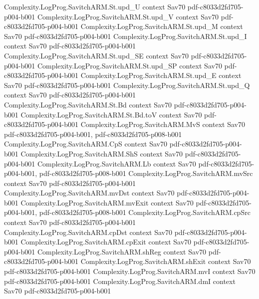 \begin{theorem}
\proofstep
  {Complexity.LogProg.SavitchARM.St.upd_U}
  {context}
  {Sav70}
  {pdf-c8033d2fd705-p004-b001}
\proofstep
  {Complexity.LogProg.SavitchARM.St.upd_V}
  {context}
  {Sav70}
  {pdf-c8033d2fd705-p004-b001}
\proofstep
  {Complexity.LogProg.SavitchARM.St.upd_M}
  {context}
  {Sav70}
  {pdf-c8033d2fd705-p004-b001}
\proofstep
  {Complexity.LogProg.SavitchARM.St.upd_I}
  {context}
  {Sav70}
  {pdf-c8033d2fd705-p004-b001}
\proofstep
  {Complexity.LogProg.SavitchARM.St.upd_SE}
  {context}
  {Sav70}
  {pdf-c8033d2fd705-p004-b001}
\proofstep
  {Complexity.LogProg.SavitchARM.St.upd_SP}
  {context}
  {Sav70}
  {pdf-c8033d2fd705-p004-b001}
\proofstep
  {Complexity.LogProg.SavitchARM.St.upd_E}
  {context}
  {Sav70}
  {pdf-c8033d2fd705-p004-b001}
\proofstep
  {Complexity.LogProg.SavitchARM.St.upd_Q}
  {context}
  {Sav70}
  {pdf-c8033d2fd705-p004-b001}
\proofstep
  {Complexity.LogProg.SavitchARM.St.Bd}
  {context}
  {Sav70}
  {pdf-c8033d2fd705-p004-b001}
\proofstep
  {Complexity.LogProg.SavitchARM.St.Bd.toV}
  {context}
  {Sav70}
  {pdf-c8033d2fd705-p004-b001}
\proofstep
  {Complexity.LogProg.SavitchARM.MvS}
  {context}
  {Sav70}
  {pdf-c8033d2fd705-p004-b001,
    pdf-c8033d2fd705-p008-b001}
\proofstep
  {Complexity.LogProg.SavitchARM.CpS}
  {context}
  {Sav70}
  {pdf-c8033d2fd705-p004-b001}
\proofstep
  {Complexity.LogProg.SavitchARM.ShS}
  {context}
  {Sav70}
  {pdf-c8033d2fd705-p004-b001}
\proofstep
  {Complexity.LogProg.SavitchARM.Lb}
  {context}
  {Sav70}
  {pdf-c8033d2fd705-p004-b001,
    pdf-c8033d2fd705-p008-b001}
\proofstep
  {Complexity.LogProg.SavitchARM.mvSrc}
  {context}
  {Sav70}
  {pdf-c8033d2fd705-p004-b001}
\proofstep
  {Complexity.LogProg.SavitchARM.mvDst}
  {context}
  {Sav70}
  {pdf-c8033d2fd705-p004-b001}
\proofstep
  {Complexity.LogProg.SavitchARM.mvExit}
  {context}
  {Sav70}
  {pdf-c8033d2fd705-p004-b001,
    pdf-c8033d2fd705-p008-b001}
\proofstep
  {Complexity.LogProg.SavitchARM.cpSrc}
  {context}
  {Sav70}
  {pdf-c8033d2fd705-p004-b001}
\proofstep
  {Complexity.LogProg.SavitchARM.cpDst}
  {context}
  {Sav70}
  {pdf-c8033d2fd705-p004-b001}
\proofstep
  {Complexity.LogProg.SavitchARM.cpExit}
  {context}
  {Sav70}
  {pdf-c8033d2fd705-p004-b001}
\proofstep
  {Complexity.LogProg.SavitchARM.shReg}
  {context}
  {Sav70}
  {pdf-c8033d2fd705-p004-b001}
\proofstep
  {Complexity.LogProg.SavitchARM.shExit}
  {context}
  {Sav70}
  {pdf-c8033d2fd705-p004-b001}
\proofstep
  {Complexity.LogProg.SavitchARM.mvI}
  {context}
  {Sav70}
  {pdf-c8033d2fd705-p004-b001}
\proofstep
  {Complexity.LogProg.SavitchARM.dmI}
  {context}
  {Sav70}
  {pdf-c8033d2fd705-p004-b001}

\end{theorem}
